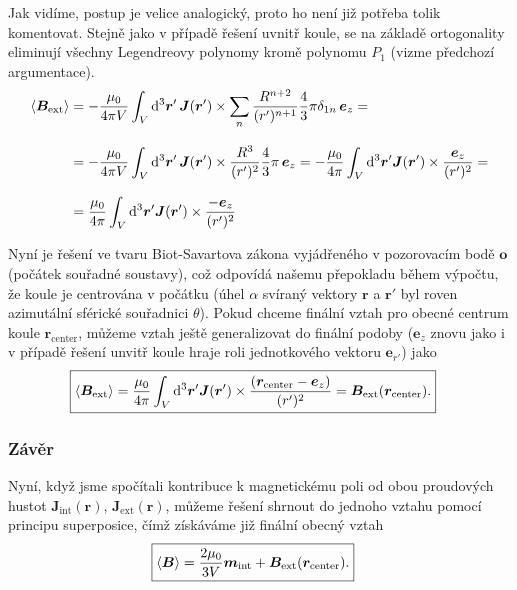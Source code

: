\documentclass[12pt,a4paper]{report}
\renewcommand{\vec}{\boldsymbol}
\def\endl{\\[3mm]}
\begin{document}
			Jak vidíme, postup je velice analogický, proto ho není již potřeba tolik komentovat. Stejně jako v případě řešení uvnitř koule, se na základě ortogonality eliminují všechny Legendreovy polynomy kromě polynomu $P_1$ (vizme předchozí argumentace).
			\begin{align*}
				\stred{\vec B_{\mathrm{ext}}} &= - \frac{\mu_0}{4 \pi V} \int_V \d^3 \vec r' \, \vec J(\vec r') \times \sum_n \frac{R^{n+2}}{(r')^{n+1}} \frac 43 \pi \delta_{1n} \, \vec e_z =
			\endl
				&= - \frac{\mu_0}{4 \pi V} \int_V \d^3 \vec r' \, \vec J(\vec r') \times \frac{R^3}{(r')^2} \frac{4}{3} \pi \, \vec e_z = - \frac{\mu_0}{4 \pi} \int_V \d^3 \vec r' \vec J(\vec r') \times \frac{\vec e_z}{(r')^2} =
			\endl
				&= \frac{\mu_0}{4 \pi} \int_V \d^3 \vec r' \vec J(\vec r') \times \frac{- \vec e_z}{(r')^2}
			\end{align*}
			
			Nyní je řešení ve tvaru Biot-Savartova zákona vyjádřeného v pozorovacím bodě $\vec o$ (počátek souřadné soustavy), což odpovídá našemu přepokladu během výpočtu, že koule je centrována v počátku (úhel $\alpha$ svíraný vektory $\vec r$ a $\vec r'$ byl roven azimutální sférické souřadnici $\theta$). Pokud chceme finální vztah pro obecné centrum koule $\vec r_{\mathrm{center}}$, můžeme vztah ještě generalizovat do finální podoby ($\vec e_z$ znovu jako i v případě řešení unvitř koule hraje roli jednotkového vektoru $\vec e_{r'}$) jako
			\begin{align*}	
				\Aboxed{\stred{\vec B_{\mathrm{ext}}} = \frac{\mu_0}{4 \pi} \int_V \d^3 \vec r' \vec J(\vec r') \times \frac{(\vec r_{\mathrm{center}} - \vec e_z)}{(r')^2} = \vec B_{\mathrm{ext}}(\vec r_{\mathrm{center}}) .}
			\end{align*}
		
		\subsubsection{Závěr}
			Nyní, když jsme spočítali kontribuce k magnetickému poli od obou proudových hustot $\vec J_{\mathrm{int}}(\vec r)$, $\vec J_{\mathrm{ext}}(\vec r)$, můžeme řešení shrnout do jednoho vztahu pomocí principu superposice, čímž získáváme již finální obecný vztah
			\begin{align*}
				\Aboxed{\stred{\vec B} = \frac{2\mu_0}{3V} \vec m_\mathrm{int} + \vec B_{\mathrm{ext}}(\vec r_{\mathrm{center}}) .}
			\end{align*}
	
	
\end{document}
